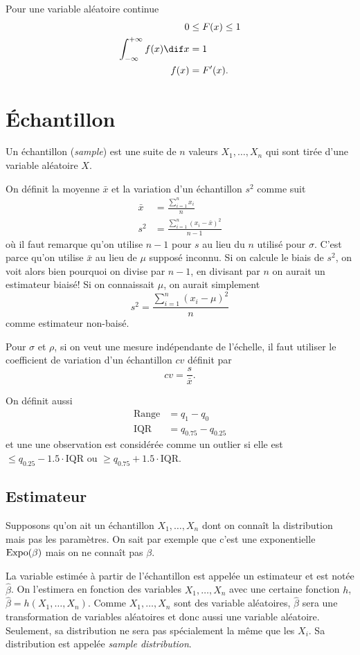 Pour une variable aléatoire continue
\begin{align*}
  0 & \leq F(x) \leq 1\\
  \int_{-\infty}^{+\infty} f(x) \dif x & = 1\\
  f(x) & = F'(x).
\end{align*}


\section{Échantillon}
Un échantillon (\emph{sample}) est une suite de $n$ valeurs $X_1, \ldots, X_n$ qui sont tirée d'une variable aléatoire $X$.

On définit la moyenne $\bar{x}$ et la variation d'un échantillon $s^2$ comme suit
\begin{align*}
  \bar{x} & = \frac{\sum_{i=1}^n x_i}{n}\\
  s^2 & = \frac{\sum_{i=1}^n (x_i - \bar{x})^2}{n-1}
\end{align*}
où il faut remarque qu'on utilise $n-1$ pour $s$ au lieu du $n$ utilisé pour $\sigma$.
C'est parce qu'on utilise $\bar{x}$ au lieu de $\mu$ supposé inconnu.
Si on calcule le biais de $s^2$, on voit alors bien pourquoi on divise par $n-1$, en divisant par $n$ on aurait un estimateur biaisé!
Si on connaissait $\mu$, on aurait simplement
\[ s^2 = \frac{\sum_{i=1}^n (x_i - \mu)^2}{n} \]
comme estimateur non-baisé.

Pour $\sigma$ et $\rho$, si on veut une mesure indépendante de l'échelle,
il faut utiliser le coefficient de variation d'un échantillon $cv$ définit par
\[ cv = \frac{s}{\bar{x}}. \]

On définit aussi
\begin{align*}
  \mathrm{Range} & = q_1 - q_0\\
  \mathrm{IQR} & = q_{0.75} - q_{0.25}
\end{align*}
et une une observation est considérée comme un outlier si elle est
$\leq q_{0.25} - 1.5\cdot\mathrm{IQR}$ ou $\geq q_{0.75} + 1.5\cdot\mathrm{IQR}$.

\subsection{Estimateur}
Supposons qu'on ait un échantillon $X_1, \ldots, X_n$ dont on connaît
la distribution mais pas les paramètres.
On sait par exemple que c'est une exponentielle $\operatorname{Expo}(\beta)$ mais on ne connaît pas $\beta$.

La variable estimée à partir de l'échantillon est appelée un estimateur et est notée $\hat{\beta}$.
On l'estimera en fonction des variables $X_1, \ldots, X_n$ avec une certaine fonction $h$,
$\hat{\beta} = h(X_1, \ldots, X_n)$.
Comme $X_1, \ldots, X_n$ sont des variable aléatoires,
$\hat{\beta}$ sera une transformation de variables aléatoires et donc aussi une variable aléatoire.
Seulement, sa distribution ne sera pas spécialement la même que les $X_i$.
Sa distribution est appelée \emph{sample distribution}.

